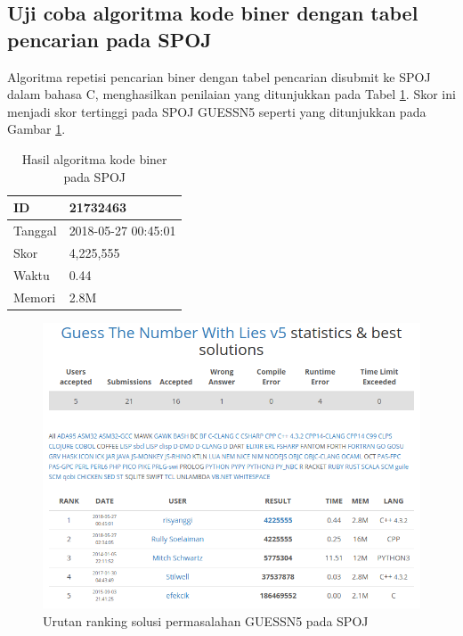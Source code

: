 \subsection{Uji coba algoritma kode biner dengan tabel pencarian pada SPOJ}

Algoritma repetisi pencarian biner dengan tabel pencarian disubmit ke SPOJ dalam bahasa C, menghasilkan penilaian yang ditunjukkan pada Tabel \ref{tab:score_binary_code}. Skor ini menjadi skor tertinggi pada SPOJ GUESSN5 seperti yang ditunjukkan pada Gambar \ref{fig:rank_guessn5_spoj}.

\begin{table}[h!]
\caption{Hasil algoritma kode biner pada SPOJ}
\label{tab:score_binary_code}
\begin{center}
\begin{tabular} {|l|l|}
\hline
ID & 21732463 \\ \hline
Tanggal & 2018-05-27 00:45:01 \\ \hline
Skor & 4,225,555 \\ \hline
Waktu & 0.44 \\ \hline
Memori & 2.8M \\ \hline
\end{tabular}
\end{center}
\end{table}

\begin{figure}
\centering
\includegraphics[scale=0.60]{../img/spoj.png}
\caption{Urutan ranking solusi permasalahan GUESSN5 pada SPOJ}
\label{fig:rank_guessn5_spoj}
\end{figure}
